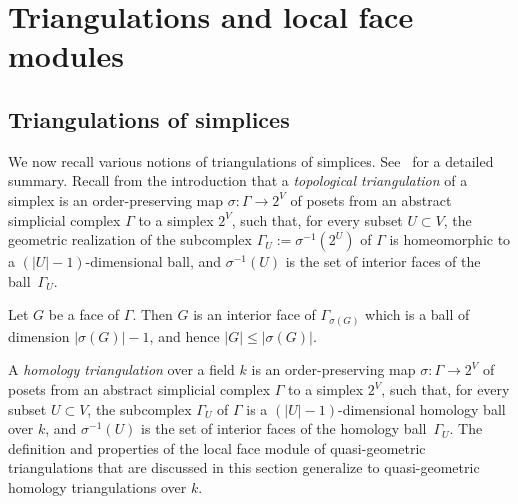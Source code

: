 \section{Triangulations and local face modules}

\subsection{Triangulations of simplices}\label{sec:triang}

We now recall various notions of triangulations of simplices. See~\cite[Section 2]{AthanasiadisSurvey} for a detailed summary. 
Recall from the introduction that a \emph{topological triangulation} of a simplex is an order-preserving  map $\sigma \colon \Gamma \to 2^V$ of posets from an abstract simplicial complex $\Gamma$ to a simplex $2^V$, 
such that, for every subset $U \subset V$, 
the geometric realization of the
subcomplex $\Gamma_U := \sigma^{-1}(2^U)$ of $\Gamma$ is homeomorphic to a $(|U| - 1)$-dimensional ball, and $\sigma^{-1}(U)$ is the set of interior faces of the ball~$\Gamma_U$. 

\begin{rema}\label{rem:GleqsigmaG}
	Let $G$ be a face of $\Gamma$. Then 
$G$ is an interior face of $\Gamma_{\sigma(G)}$ which is a ball of dimension $|\sigma(G)| - 1$, and hence  $|G| \le |\sigma(G)|$. 
\end{rema}

\begin{rema}\label{rem:homology1}
A \emph{homology triangulation} over a field $k$ 
is an order-preserving  map $\sigma \colon \Gamma \to 2^V$ of posets from an abstract simplicial complex $\Gamma$ to a simplex $2^V$, 
such that, for every subset $U \subset V$, 
the
subcomplex $\Gamma_U$ of $\Gamma$ is a $(|U| - 1)$-dimensional homology ball over $k$, and $\sigma^{-1}(U)$ is the set of interior faces of the homology ball~$\Gamma_U$.
The definition and properties of the local face module of quasi-geometric triangulations that are discussed in this section generalize to quasi-geometric homology triangulations over $k$. 
\end{rema}

